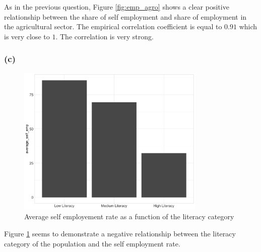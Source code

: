 As in the previous question, Figure \ref{fig:emp_agro} shows a clear positive relationship between the share of self employment and share of employment in the agricultural sector. The empirical correlation coefficient is equal to $0.91$
which is very close to $1$. The correlation is very strong.

\subsubsection*{(c)}
\begin{figure}[H]
  \centering
  \includegraphics[width=0.8\textwidth]{Exercise_1/OUTPUT/bar_emp_literacy.png}
  \caption{Average self employement rate as a function of the literacy category}
  \label{fig:emp_lit}
\end{figure}

Figure \ref{fig:emp_lit} seems to demonstrate a negative relationship between the literacy category of the population and the self employment rate.

\subsection{}
